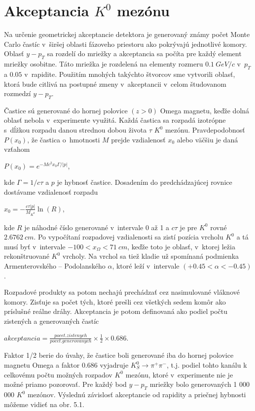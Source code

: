 \section{Akceptancia $K^{0}$ mezónu}
Na určenie geometrickej akceptancie detektora je generovaný známy počet Monte
Carlo častíc v~širšej oblasti fázoveho priestoru ako pokrývajú
jednotlivé komory. Oblasť $y-p_{T}$ sa rozdelí do mriežky a akceptancia
sa počíta pre každý element mriežky osobitne. Táto mriežka je rozdelená na
elementy rozmeru $0.1\: GeV/c$ v~$p_{T}$ a $0.05$ v~rapidite. Použitím
mnohých takýchto štvorcov sme vytvorili oblasť, ktorá bude citlivá na
postupné zmeny v~akceptancii v~celom študovanom rozmedzí $y-p_{T}$.

Častice sú generované do hornej polovice $(z>0)$ Omega magnetu, keďže
dolná oblasť nebola v~experimente využitá.  Každá častica sa rozpadá
izotrópne s~dĺžkou rozpadu danou 
strednou dobou života $\tau$ $K^{0}$ mezónu. Pravdepodobnosť $P(x_{0})$, že
častica o~hmotnosti $M$ prejde vzdialenosť $x_{0}$  alebo väčšiu je daná
vzťahom
\begin{center}
  $P(x_{0})=e^{-Mc^{2}x_{0}\Gamma/|p|}$,
\end{center}
kde $\Gamma = 1 / c\tau$ a $p$ je hybnosť častice. Dosadením do
predchádzajúcej rovnice dostávame vzdialenosť rozpadu
\begin{center}
  $x_{0}=-\frac{c\tau |p|}{M_{K^{0}}}\ln(R)$,
\end{center}
kde $R$ je náhodné číslo generované v~intervale 0 až 1 a $c\tau$ je pre
$K^{0}$ rovné $2.6762~cm$. Po vypočítaní rozpadovej vzdialenosti sa zistí
pozícia vrcholu $K^{0}$ a tá musí byť v~intervale $-100<x_{\Omega}<71\: cm$,
keďže toto je oblasť, v~ktorej ležia rekonštruované $K^{0}$ vrcholy.
Na vrchol sa tiež kladie už spomínaná podmienka Armenterovského --
Podolanského $\alpha$, ktoré leží v~intervale $(+0.45<\alpha<-0.45)$.
 
Rozpadové produkty  sa potom nechajú prechádzať cez nasimulované vláknové
komory. Zisťuje sa počet tých, ktoré prešli cez všetkých sedem komôr  ako
príslušné reálne dráhy.
Akceptancia je potom definovaná ako podiel počtu zistených a generovaných
častíc
\begin{center}
  $akceptancia=\frac{pocet.zistenych}{pocet.generovanych} \times \frac{1}{2}
\times 0.686$.
\end{center}
Faktor 1/2  berie do úvahy, že častice boli generované iba do hornej
polovice magnetu Omega a faktor 0.686 vyjadruje   
$K^{0}_{S} \longrightarrow \pi^{+} \pi^{-}$, t.j. podiel tohto kanálu k
celkovému počtu možných rozpadov  $K^{0}$ mezónu, ktoré v~experimente nie je
možné priamo pozorovať. Pre každý bod  $y-p_{T}$ mriežky bolo generovaných 
1 000 000 $K^{0}$ mezónov. Výslednú závislosť akceptancie od rapidity a
priečnej hybnosti môžeme vidieť na obr. 5.1.

